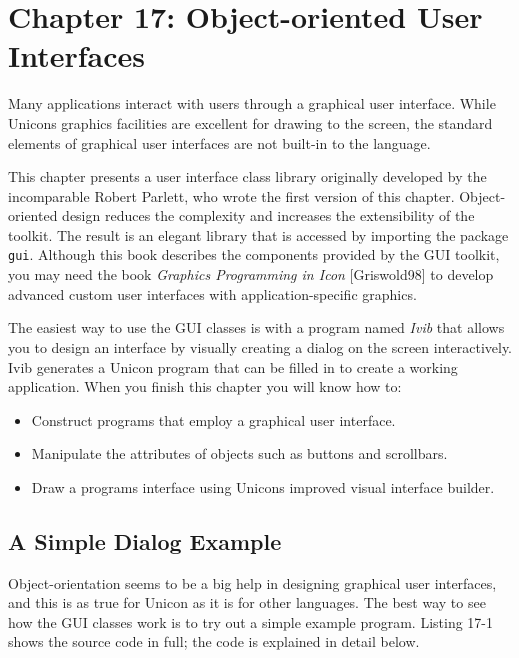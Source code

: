 \clearpage\section{Chapter 17: Object-oriented User Interfaces}

Many applications interact with users through a graphical
user interface. While
Unicon{\textquotesingle}s graphics facilities are
excellent for drawing to the screen,
the standard elements of graphical user interfaces are not built-in to the language.

This chapter presents a user interface class library originally developed
by the incomparable Robert Parlett, who wrote the first version of this
chapter. Object-oriented design reduces the
complexity and increases the extensibility of the toolkit. The result is
an elegant library that is accessed by importing the package \texttt{gui}.
Although this book describes the components provided by the
GUI toolkit, you may need the book \textit{Graphics
Programming in Icon} [Griswold98] to develop advanced custom user
interfaces with application-specific graphics.

The easiest way to use the GUI classes is with a program named
\textit{Ivib} that allows you to design an interface by visually
creating a dialog on the screen interactively. Ivib
generates a Unicon program that can be filled in to create a working
application. When you finish this chapter you will know how to:

\begin{itemize}
\item Construct programs that employ a graphical user interface.
\item Manipulate the attributes of objects such as buttons and
scrollbars.
\item Draw a program{\textquotesingle}s interface using
Unicon{\textquotesingle}s improved visual interface builder.
\end{itemize}
\subsection[A Simple Dialog Example]{A Simple Dialog Example}
Object-orientation seems to be a big help in designing
graphical user interfaces, and this is as true for Unicon as it is for
other languages. The best way to see how the GUI classes work is to try
out a simple example program. Listing 17-1 shows the source code in
full; the code is explained in detail below.

